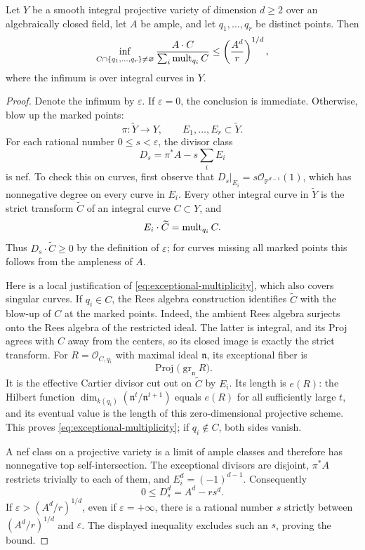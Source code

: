 \begin{lemma}\label{lem:volume-bound}
Let $Y$ be a smooth integral projective variety of dimension $d\geq2$ over an algebraically closed field, let $A$ be ample, and let $q_1,\ldots,q_r$ be distinct points.  Then
\[
 \inf_{C\cap\{q_1,\ldots,q_r\}\ne\varnothing}
 \frac{A\cdot C}{\sum_i\operatorname{mult}_{q_i}C}
 \leq \left(\frac{A^d}{r}\right)^{1/d},
\]
where the infimum is over integral curves in $Y$.
\end{lemma}

\begin{proof}
Denote the infimum by $\varepsilon$.  If $\varepsilon=0$, the conclusion is immediate.  Otherwise, blow up the marked points:
\[
 \pi:\widetilde Y\longrightarrow Y,
 \qquad E_1,\ldots,E_r\subset\widetilde Y.
\]
For each rational number $0\leq s<\varepsilon$, the divisor class
\[
 D_s=\pi^*A-s\sum_i E_i
\]
is nef.  To check this on curves, first observe that $D_s|_{E_i}=s\mathcal{O}_{\mathbb{P}^{d-1}}(1)$, which has nonnegative degree on every curve in $E_i$.  Every other integral curve in $\widetilde Y$ is the strict transform $\widetilde C$ of an integral curve $C\subset Y$, and
\begin{equation}\label{eq:exceptional-multiplicity}
 E_i\cdot\widetilde C=\operatorname{mult}_{q_i}C.
\end{equation}
Thus $D_s\cdot\widetilde C\geq0$ by the definition of $\varepsilon$; for curves missing all marked points this follows from the ampleness of $A$.

Here is a local justification of \eqref{eq:exceptional-multiplicity}, which also covers singular curves.  If $q_i\in C$, the Rees algebra construction identifies $\widetilde C$ with the blow-up of $C$ at the marked points. Indeed, the ambient Rees algebra surjects onto the Rees algebra of the restricted ideal.  The latter is integral, and its Proj agrees with $C$ away from the centers, so its closed image is exactly the strict transform. For $R=\mathcal{O}_{C,q_i}$ with maximal ideal $\mathfrak{n}$, its exceptional fiber is
\[
 \operatorname{Proj}\bigl(\operatorname{gr}_{\mathfrak{n}}R\bigr).
\]
It is the effective Cartier divisor cut out on $\widetilde C$ by $E_i$. Its length is $e(R)$: the Hilbert function $\dim_{k(q_i)}(\mathfrak{n}^t/\mathfrak{n}^{t+1})$ equals $e(R)$ for all sufficiently large $t$, and its eventual value is the length of this zero-dimensional projective scheme.  This proves \eqref{eq:exceptional-multiplicity}; if $q_i\notin C$, both sides vanish.

A nef class on a projective variety is a limit of ample classes and therefore has nonnegative top self-intersection.  The exceptional divisors are disjoint, $\pi^*A$ restricts trivially to each of them, and $E_i^d=(-1)^{d-1}$.  Consequently
\[
 0\leq D_s^d=A^d-rs^d.
\]
If $\varepsilon>(A^d/r)^{1/d}$, even if $\varepsilon=+\infty$, there is a rational number $s$ strictly between $(A^d/r)^{1/d}$ and $\varepsilon$. The displayed inequality excludes such an $s$, proving the bound.
\end{proof}

